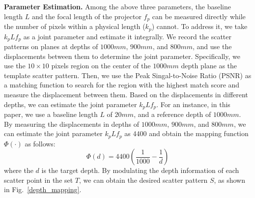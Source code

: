 %
%


\textbf{Parameter Estimation.} 
Among the above three parameters, the baseline length $L$ and the focal length of the projector $f_p$ can be measured directly while the number of pixels within a physical length ($k_p$)  cannot.
To address it, we take $k_pLf_p$  as a joint parameter and estimate it integrally.
We record the scatter patterns on planes at depths of $1000mm$, $900mm$, and $800mm$, and use the displacements between them to determine the joint parameter. Specifically, we use the $10 \times 10$ pixels region on the center of the $1000mm$ depth plane as the template scatter pattern. Then, we use the Peak Singal-to-Noise Ratio (PSNR) as a matching function to search for the region with the highest match score and measure the displacement between them. Based on the displacements in different depths, we can estimate the joint parameter $k_pLf_p$. 
For an instance, in this paper, we use a baseline length $L$ of $20mm$, and a reference depth of $1000mm$. By measuring the displacements in depths of $1000mm$, $900mm$, and $800mm$, we can estimate the joint parameter $k_pLf_p$ as 4400 and obtain the mapping function $\Phi(\cdot)$ as follows:
\begin{equation}
		\Phi(d) = 4400 (\frac{1}{1000} - \frac{1}{d}) 
	\label{d_cal3}
\end{equation}
where the $d$ is the target depth.
By modulating the depth information of each scatter point in the set $T$, we can obtain the desired scatter pattern $S$, as shown in Fig.~\ref{depth_mapping}.

